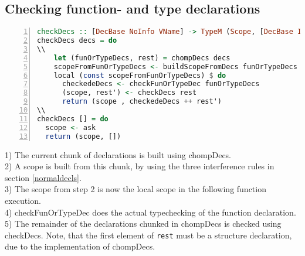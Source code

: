 \subsection{Checking function- and type declarations}
\label{subsec:checkfunortype}
\begin{lstlisting}[language=Haskell, numbers=left]
checkDecs :: [DecBase NoInfo VName] -> TypeM (Scope, [DecBase Info VName])
checkDecs decs = do
\\
    let (funOrTypeDecs, rest) = chompDecs decs
    scopeFromFunOrTypeDecs <- buildScopeFromDecs funOrTypeDecs
    local (const scopeFromFunOrTypeDecs) $ do
      checkedeDecs <- checkFunOrTypeDec funOrTypeDecs
      (scope, rest') <- checkDecs rest
      return (scope , checkedeDecs ++ rest')
\\
checkDecs [] = do
  scope <- ask
  return (scope, [])
\end{lstlisting}
1) The current chunk of declarations is built using chompDecs. \\
2) A scope is built from this chunk, by using the three interference rules in
section \ref{normaldecls}.\\
3) The scope from step 2 is now the local scope in the following function
execution.\\
4) checkFunOrTypeDec does the actual typechecking of the function declaration. \\
5) The remainder of the declarations chunked in chompDecs is checked using
checkDecs. Note, that the first element of \texttt{rest} must be a structure
declaration, due to the implementation of chompDecs.
